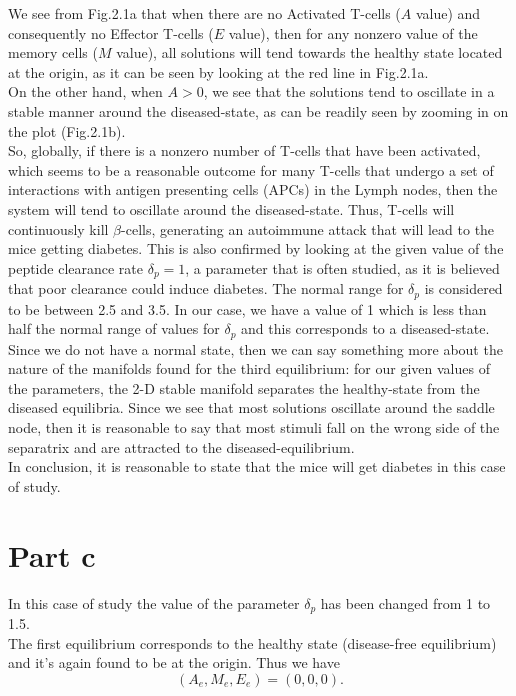 We see from Fig.2.1a that when there are no Activated T-cells ($A$ value) and consequently no Effector T-cells ($E$ value), then for any nonzero value of the memory cells ($M$ value), all solutions will tend towards the healthy state located at the origin, as it can be seen by looking at the red line in Fig.2.1a.\\
On the other hand, when $A> 0$, we see that the solutions tend to oscillate in a stable manner around the diseased-state, as can be readily seen by zooming in on the plot (Fig.2.1b).\\ So, globally, if there is a nonzero number of T-cells that have been activated, which seems to be a reasonable outcome for many T-cells that undergo a set of interactions with antigen presenting cells (APCs) in the Lymph nodes, then the system will tend to oscillate around the diseased-state. Thus, T-cells will continuously kill $\beta$-cells, generating an autoimmune attack that will lead to the mice getting diabetes. This is also confirmed by looking at the given value of the peptide clearance rate $\delta_{p}=1$, a parameter that is often studied, as it is believed that poor clearance could induce diabetes. The normal range for $\delta_{p}$ is considered to be between 2.5 and 3.5. In our case, we have a value of 1 which is less than half the normal range of values for $\delta_{p}$ and this corresponds to a diseased-state. Since we do not have a normal state, then we can say something more about the nature of the manifolds found for the third equilibrium: for our given values of the parameters, the 2-D stable manifold separates the healthy-state from the diseased equilibria. Since we see that most solutions oscillate around the saddle node, then it is reasonable to say that most stimuli fall on the wrong side of the separatrix and are attracted to the diseased-equilibrium.\\
In conclusion, it is reasonable to state that the mice will get diabetes in this case of study.\\

\section{Part c}

In this case of study the value of the parameter $\delta_{p}$ has been changed from 1 to 1.5.\\
The first equilibrium corresponds to the healthy state (disease-free equilibrium) and it's again found to be at the origin. Thus we have
$$
(A_{e},M_{e},E_{e})= (0,0,0).
$$

